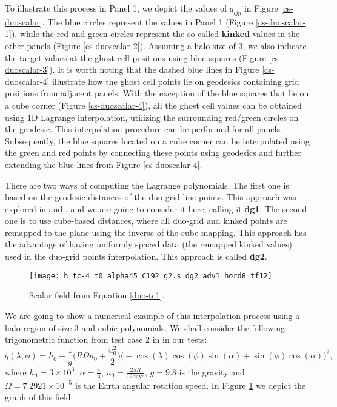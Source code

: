 To illustrate this process in Panel 1, we depict the values of $q_{ijp}$ in Figure \ref{cs-duoscalar}. 
The blue circles represent the values in Panel 1 (Figure \ref{cs-duoscalar-1}), while the red and green circles 
represent the so called \textbf{kinked} values in the other panels (Figure \ref{cs-duoscalar-2}). 
Assuming a halo size of 3, we also indicate the target values at the ghost cell 
positions using blue squares (Figure \ref{cs-duoscalar-3}). 
It is worth noting that the dashed blue lines in Figure \ref{cs-duoscalar-4} 
illustrate how the ghost cell points lie on geodesics containing grid positions from adjacent panels.
With the exception of the blue squares that lie on a cube corner (Figure \ref{cs-duoscalar-4}),
all the ghost cell values can be obtained using 1D Lagrange interpolation, 
utilizing the surrounding red/green circles on the geodesic. 
This interpolation procedure can be performed for all panels. 
Subsequently, the blue squares located on a cube corner can be interpolated using the 
green and red points by connecting these points using geodesics and further extending the blue lines from Figure \ref{cs-duoscalar-4}.

There are two ways of computing the Lagrange polynomials.
The first one is based on the geodesic distances of the duo-grid line points.
This approach was explored in \citet{chen:2021} and \citet{mouallem:2023}, and we are going to consider it here, calling it \textbf{dg1}.
The second one is to use cube-based distances, where all duo-grid and kinked points are remapped to the plane using the inverse of the cube mapping. 
This approach has the advantage of having uniformly spaced data (the remapped kinked values) used in the duo-grid points interpolation.
This approach is called \textbf{dg2}.
\begin{figure}[!htb]
	\centering
	\texttt{[image: h\_tc-4\_t0\_alpha45\_C192\_g2.s\_dg2\_adv1\_hord8\_tf12]}
	\caption{Scalar field from Equation \eqref{duo-tc1}.\label{cs-duo-tc1}}
\end{figure}

We are going to show a numerical example of this interpolation process using a halo region of size 3 and cubic polynomials.
We shall consider the following trigonometric function
from test case 2 in \citet{will:1992} in our tests:
\begin{equation}
\label{duo-tc1}
q(\lambda, \phi) = h_0 - \frac{1}{g}\bigg(R\Omega u_0 + \frac{u_0^2}{2}\bigg)
\bigg( -\cos(\lambda)\cos(\phi)\sin(\alpha) + \sin(\phi)\cos(\alpha) \bigg)^2,
\end{equation}
where $h_0 = 3\times 10^3 $,
$\alpha=\frac{\pi}{4}$, $u_0 = \frac{2\pi R}{12 \text{days}}$,  $g=9.8$ is the gravity and $\Omega=7.2921 \times 10^{-5}$ is the Earth angular rotation speed.
In Figure \ref{cs-duo-tc1} we depict the graph of this field.

